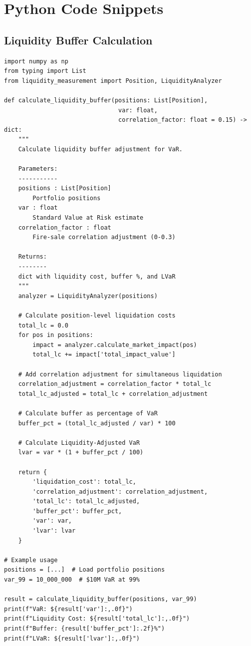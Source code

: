 \documentclass[11pt,a4paper]{article}
\begin{document}
\appendix

\section{Python Code Snippets}

\subsection{Liquidity Buffer Calculation}

\begin{lstlisting}[caption=Liquidity Buffer Implementation]
import numpy as np
from typing import List
from liquidity_measurement import Position, LiquidityAnalyzer

def calculate_liquidity_buffer(positions: List[Position],
                                var: float,
                                correlation_factor: float = 0.15) -> dict:
    """
    Calculate liquidity buffer adjustment for VaR.

    Parameters:
    -----------
    positions : List[Position]
        Portfolio positions
    var : float
        Standard Value at Risk estimate
    correlation_factor : float
        Fire-sale correlation adjustment (0-0.3)

    Returns:
    --------
    dict with liquidity cost, buffer %, and LVaR
    """
    analyzer = LiquidityAnalyzer(positions)

    # Calculate position-level liquidation costs
    total_lc = 0.0
    for pos in positions:
        impact = analyzer.calculate_market_impact(pos)
        total_lc += impact['total_impact_value']

    # Add correlation adjustment for simultaneous liquidation
    correlation_adjustment = correlation_factor * total_lc
    total_lc_adjusted = total_lc + correlation_adjustment

    # Calculate buffer as percentage of VaR
    buffer_pct = (total_lc_adjusted / var) * 100

    # Calculate Liquidity-Adjusted VaR
    lvar = var * (1 + buffer_pct / 100)

    return {
        'liquidation_cost': total_lc,
        'correlation_adjustment': correlation_adjustment,
        'total_lc': total_lc_adjusted,
        'buffer_pct': buffer_pct,
        'var': var,
        'lvar': lvar
    }

# Example usage
positions = [...]  # Load portfolio positions
var_99 = 10_000_000  # $10M VaR at 99%

result = calculate_liquidity_buffer(positions, var_99)
print(f"VaR: ${result['var']:,.0f}")
print(f"Liquidity Cost: ${result['total_lc']:,.0f}")
print(f"Buffer: {result['buffer_pct']:.2f}%")
print(f"LVaR: ${result['lvar']:,.0f}")
\end{lstlisting}
\end{document}
